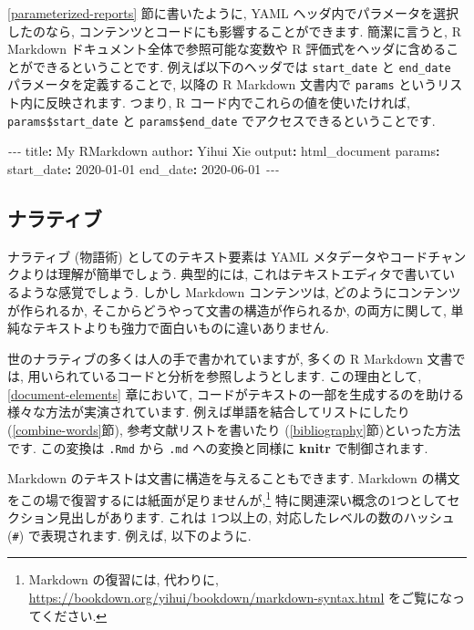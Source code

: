 \documentclass[
  11pt,
  lualatex,ja=standard,jafont=noto]{bxjsreport}
\newenvironment{Shaded}{\begin{snugshade}}{\end{snugshade}}
\newcommand{\AttributeTok}[1]{\textcolor[rgb]{0.77,0.63,0.00}{#1}}
\newcommand{\FunctionTok}[1]{\textcolor[rgb]{0.00,0.00,0.00}{#1}}
\newcommand{\KeywordTok}[1]{\textcolor[rgb]{0.13,0.29,0.53}{\textbf{#1}}}
\newcommand{\PreprocessorTok}[1]{\textcolor[rgb]{0.56,0.35,0.01}{\textit{#1}}}
\newcommand{\StringTok}[1]{\textcolor[rgb]{0.31,0.60,0.02}{#1}}
\begin{document}
\ref{parameterized-reports} 節に書いたように, YAML ヘッダ内でパラメータを選択したのなら, コンテンツとコードにも影響することができます. 簡潔に言うと, R Markdown ドキュメント全体で参照可能な変数や R 評価式をヘッダに含めることができるということです. 例えば以下のヘッダでは \texttt{start\_date} と \texttt{end\_date} パラメータを定義することで, 以降の R Markdown 文書内で \texttt{params} というリスト内に反映されます. つまり, R コード内でこれらの値を使いたければ, \texttt{params\$start\_date} と \texttt{params\$end\_date} でアクセスできるということです.

\begin{Shaded}
\begin{Highlighting}[]
\PreprocessorTok{{-}{-}{-}}
\FunctionTok{title}\KeywordTok{:}\AttributeTok{ My RMarkdown}
\FunctionTok{author}\KeywordTok{:}\AttributeTok{ Yihui Xie}
\FunctionTok{output}\KeywordTok{:}\AttributeTok{ html\_document}
\FunctionTok{params}\KeywordTok{:}
\AttributeTok{  }\FunctionTok{start\_date}\KeywordTok{:}\AttributeTok{ }\StringTok{\textquotesingle{}2020{-}01{-}01\textquotesingle{}}
\AttributeTok{  }\FunctionTok{end\_date}\KeywordTok{:}\AttributeTok{ }\StringTok{\textquotesingle{}2020{-}06{-}01\textquotesingle{}}
\PreprocessorTok{{-}{-}{-}}
\end{Highlighting}
\end{Shaded}

\hypertarget{narrative}{%
\subsection{ナラティブ}\label{narrative}}

ナラティブ (物語術) としてのテキスト要素は YAML メタデータやコードチャンクよりは理解が簡単でしょう. 典型的には, これはテキストエディタで書いているような感覚でしょう. しかし Markdown コンテンツは, どのようにコンテンツが作られるか, そこからどうやって文書の構造が作られるか, の両方に関して, 単純なテキストよりも強力で面白いものに違いありません.

世のナラティブの多くは人の手で書かれていますが, 多くの R Markdown 文書では, 用いられているコードと分析を参照しようとします. この理由として, \ref{document-elements} 章において, コードがテキストの一部を生成するのを助ける様々な方法が実演されています. 例えば単語を結合してリストにしたり (\ref{combine-words}節), 参考文献リストを書いたり (\ref{bibliography}節)といった方法です. この変換は \texttt{.Rmd} から \texttt{.md} への変換と同様に \textbf{knitr} で制御されます.

Markdown のテキストは文書に構造を与えることもできます. Markdown の構文をこの場で復習するには紙面が足りませんが,\footnote{Markdown の復習には, 代わりに, \url{https://bookdown.org/yihui/bookdown/markdown-syntax.html} をご覧になってください.} 特に関連深い概念の1つとしてセクション見出しがあります. これは 1つ以上の, 対応したレベルの数のハッシュ (\texttt{\#}) で表現されます. 例えば, 以下のように.
\end{document}
